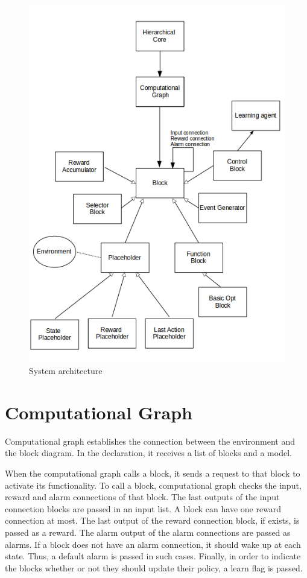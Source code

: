 \begin{figure}[t!]
      \centering
      \includegraphics[width = \textwidth]{./pictures/overall_new.png}
      \caption{System architecture}
      \label{fig:overall}
\end{figure}

\section{Computational Graph}
Computational graph establishes the connection between the environment and the block diagram. In the declaration, it receives a list of blocks and a model. 

When the computational graph calls a block, it sends a request to that block to activate its functionality. To call a block, computational graph checks the input, reward and alarm connections of that block. The last outputs of the input connection blocks are passed in an input list. A block can have one reward connection at most. The last output of the reward connection block, if exists, is passed as a reward. The alarm output of the alarm connections are passed as alarms. If a block does not have an alarm connection, it should wake up at each state. Thus, a default alarm is passed in such cases. Finally, in order to indicate the blocks whether or not they should update their policy, a learn flag is passed.

